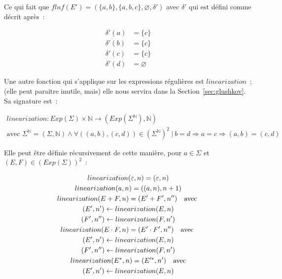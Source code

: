\begin{example}
    Ce qui fait que \(flnf(E') = (\{a, b\}, \{a, b, c\}, \varnothing, \delta')\)
    avec \(\delta'\) qui est défini comme décrit après~:

    \begin{align*}
        \delta'(a) & = \{c\}       \\
        \delta'(b) & = \{c\}       \\
        \delta'(c) & = \{c\}       \\
        \delta'(d) & = \varnothing
    \end{align*}

\end{example}

\vphantom{}

Une autre fonction qui s'applique sur les expressions régulières est
\(linearization\)~; (elle peut paraitre inutile, mais) elle nous servira dans
la Section~\ref{sec:glushkov}. Sa signature est~:

\begin{gather*}
    linearization: Exp(\Sigma) \times \mathbb{N} \to (Exp(\Sigma^{\mathbb{N}}), \mathbb{N}) \\
    \text{avec } \Sigma^{\mathbb{N}} = (\Sigma, \mathbb{N}) \land \forall ((a, b), (c, d)) \in (\Sigma^{\mathbb{N}})^2 ~|~ b = d \Rightarrow a = c \Rightarrow (a, b) = (c, d)
\end{gather*}

Elle peut être définie récursivement de cette manière, pour \(a \in \Sigma\) et
\((E, F) \in (Exp(\Sigma))^2\)~:

\begin{gather}
    linearization(\varepsilon, n) = (\varepsilon, n) \\
    linearization(a, n) = ((a, n), n + 1) \\
    linearization(E + F, n) = (E' + F', n'') \quad \text{avec } \\
    (E', n') \leftarrow linearization(E, n) \notag \\
    (F', n'') \leftarrow linearization(F, n') \notag \\
    linearization(E \cdot F, n) = (E' \cdot F', n'') \quad \text{avec } \\
    (E', n') \leftarrow linearization(E, n) \notag \\
    (F', n'') \leftarrow linearization(F, n') \notag \\
    linearization(E^*, n) = (E'^*, n') \quad \text{avec} \\
    (E', n') \leftarrow linearization(E, n) \notag
\end{gather}

